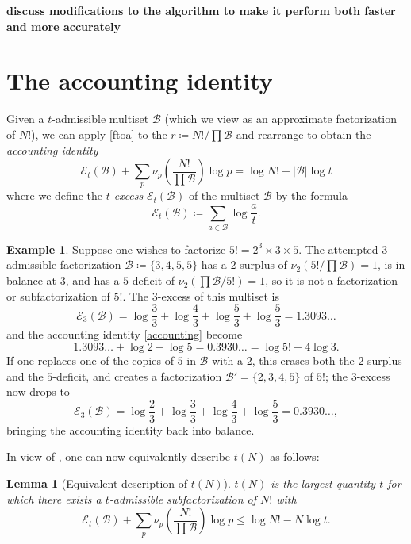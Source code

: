 \documentclass[12pt,a4paper,reqno]{amsart}
\numberwithin{equation}{section}
\theoremstyle{plain}
\newtheorem{lemma}[theorem]{Lemma}
\theoremstyle{definition}
\newtheorem{example}[theorem]{Example}
\newcommand\tuple{{\mathcal B}}
\newcommand\excess{{\mathcal{E}}}
\begin{document}
{\bf discuss modifications to the algorithm to make it perform both faster and more accurately}

\section{The accounting identity}\label{accounting-sec}

Given a $t$-admissible multiset $\tuple$ (which we view as an approximate factorization of $N!$), we can apply \eqref{ftoa} to the  $r \coloneqq N!/\prod \tuple$ and rearrange to obtain the \emph{accounting identity}
\begin{equation}\label{accounting} 
  \excess_t(\tuple) + \sum_p \nu_p\left( \frac{N!}{\prod \tuple} \right) \log p = \log N! - |\tuple| \log t
\end{equation}
where we define the \emph{$t$-excess} $\excess_t(\tuple)$ of the multiset $\tuple$ by the formula
\begin{equation}\label{excess-def}
  \excess_t(\tuple) \coloneqq \sum_{a \in \tuple} \log \frac{a}{t}.
\end{equation}

\begin{example} Suppose one wishes to factorize $5! = 2^3 \times 3 \times 5$.  The attempted $3$-admissible factorization $\tuple \coloneqq \{3,4,5,5\}$ has a $2$-surplus of $\nu_2(5!/\prod \tuple) = 1$, is in balance at $3$, and has a $5$-deficit of $\nu_2(\prod \tuple/5!) = 1$, so it is not a factorization or subfactorization of $5!$.  The $3$-excess of this multiset is
  $$ \excess_3(\tuple) = \log \frac{3}{3} + \log \frac{4}{3} + \log \frac{5}{3} + \log \frac{5}{3} = 1.3093\dots$$
  and the accounting identity \eqref{accounting} become
  $$ 1.3093\dots + \log 2 - \log 5 = 0.3930\dots = \log 5! - 4 \log 3.$$
  If one replaces one of the copies of $5$ in ${\mathcal B}$ with a $2$, this erases both the $2$-surplus and the $5$-deficit, and creates a factorization $\tuple' = \{2,3,4,5\}$ of $5!$; the $3$-excess now drops to
  $$ \excess_3(\tuple) = \log \frac{2}{3} + \log \frac{3}{3} + \log \frac{4}{3} + \log \frac{5}{3}  = 0.3930\dots,$$
  bringing the accounting identity back into balance.
\end{example}
  
In view of , one can now equivalently describe 
$t(N)$ as follows:

\begin{lemma}[Equivalent description of $t(N)$]\label{t-descrip}  $t(N)$ is the largest quantity $t$ for which there exists a $t$-admissible subfactorization of $N!$ with
$$ \excess_t(\tuple) + \sum_p \nu_p\left( \frac{N!}{\prod \tuple} \right) \log p \leq \log N! - N \log t.$$
\end{lemma}
\end{document}
